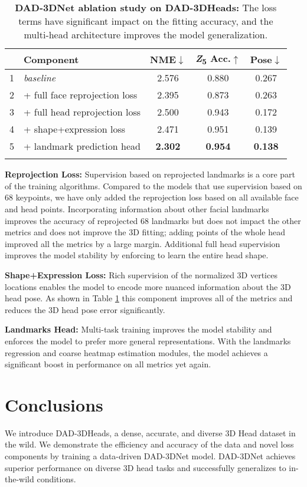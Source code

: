 \documentclass[10pt,twocolumn,letterpaper]{article}
\begin{document}
\begin{table}[h!]
\footnotesize
\renewcommand{\arraystretch}{0.95}
\centering
\begin{tabular}{r|l|ccc}
\noalign{\smallskip}
 & \textbf{Component} & \textbf{NME}{$\downarrow$} & {\textbf{\textit{Z}\textsubscript{5}} \textbf{Acc.}{$\uparrow$}} & \textbf{Pose}{$\downarrow$}\\
\hline
1 & \textit{baseline} & 2.576 & 0.880 & 0.267\\
2 & + full face reprojection loss & 2.395 & 0.873 & 0.263\\
3 & + full head reprojection loss & 2.500 & 0.943 & 0.172\\
4 & + shape+expression loss & 2.471 & 0.951 & 0.139 \\
5 & + landmark prediction head & \textbf{2.302} & \textbf{0.954} & \textbf{0.138} \\
\noalign{\smallskip}
\end{tabular}
\caption{ \textbf{DAD-3DNet ablation study on DAD-3DHeads:} 
The loss terms have significant impact on the fitting accuracy, and the multi-head architecture improves the model generalization.}
\label{t:ablation}
\end{table} 
\textbf{Reprojection Loss:} Supervision based on reprojected landmarks is a core part of the training algorithms. Compared to the models that use supervision based on 68 keypoints, we have only added the reprojection loss based on all available face and head points. Incorporating information about other facial landmarks improves the accuracy of reprojected 68 landmarks but does not impact the other metrics and does not improve the 3D fitting; adding points of  the whole head improved all the metrics by a large margin. Additional full head supervision improves the model stability by enforcing to learn the entire head shape.

\textbf{Shape+Expression Loss:} Rich supervision of the normalized 3D vertices locations enables the model to encode more nuanced information about the 3D head pose. As shown in Table \ref{t:ablation} this component improves all of the metrics and reduces the 3D head pose error significantly.

\textbf{Landmarks Head:} Multi-task training improves the model stability and enforces the model to prefer more general representations. With the landmarks regression and coarse heatmap estimation modules, the model achieves a significant boost in performance on all metrics yet again.
 \section{Conclusions}
We introduce DAD-3DHeads, a dense, accurate, and diverse 3D Head dataset in the wild. We demonstrate the efficiency and accuracy of the data and novel loss components by training a data-driven DAD-3DNet model. DAD-3DNet achieves superior performance on diverse 3D head tasks and successfully generalizes to in-the-wild conditions. 
\end{document}
